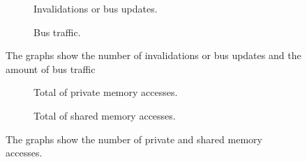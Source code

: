 \begin{figure}[H]
    \centering
    \begin{subfigure}[b]{0.5\textwidth}
        \centering
        \caption{Invalidations or bus updates.}\label{fig:invalidations_advanced}
    \end{subfigure}%
    \hfill
    \begin{subfigure}[b]{0.5\textwidth}
        \centering
        \caption{Bus traffic.}\label{fig:bus_traffic_advanced}
    \end{subfigure}%
    \hfill
    \caption{The graphs show the number of invalidations or bus updates and the amount of bus traffic}\label{fig:inv_bus_advanced}
\end{figure}

\begin{figure}[H]
    \centering
    \begin{subfigure}[b]{0.5\textwidth}
        \centering
        \caption{Total of private memory accesses.}\label{fig:total_private_accesses_advanced}
    \end{subfigure}%
    \hfill
    \begin{subfigure}[b]{0.5\textwidth}
        \centering
        \caption{Total of shared memory accesses.}\label{fig:total_shared_accesses_advanced}
    \end{subfigure}%
    \hfill
    \caption{The graphs show the number of private and shared memory accesses.}\label{fig:accesses_advanced}
\end{figure}

